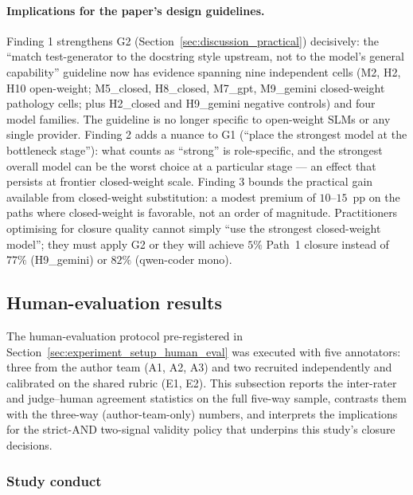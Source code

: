 \paragraph{Implications for the paper's design guidelines.}
Finding 1 strengthens G2 (Section~\ref{sec:discussion_practical}) decisively: the ``match test-generator to the docstring style upstream, not to the model's general capability'' guideline now has evidence spanning nine independent cells (M2, H2, H10 open-weight; M5\_closed, H8\_closed, M7\_gpt, M9\_gemini closed-weight pathology cells; plus H2\_closed and H9\_gemini negative controls) and four model families. The guideline is no longer specific to open-weight SLMs or any single provider. Finding 2 adds a nuance to G1 (``place the strongest model at the bottleneck stage''): what counts as ``strong'' is role-specific, and the strongest overall model can be the worst choice at a particular stage --- an effect that persists at frontier closed-weight scale. Finding 3 bounds the practical gain available from closed-weight substitution: a modest premium of $10$--$15$~pp on the paths where closed-weight is favorable, not an order of magnitude. Practitioners optimising for closure quality cannot simply ``use the strongest closed-weight model''; they must apply G2 or they will achieve $5\%$ Path~1 closure instead of $77\%$ (H9\_gemini) or $82\%$ (qwen-coder mono).

\subsection{Human-evaluation results}
\label{sec:results_human_eval}

The human-evaluation protocol pre-registered in
Section~\ref{sec:experiment_setup_human_eval} was executed with five
annotators: three from the author team (A1, A2, A3) and two recruited
independently and calibrated on the shared rubric (E1, E2). This
subsection reports the inter-rater and judge--human agreement
statistics on the full five-way sample, contrasts them with the
three-way (author-team-only) numbers, and interprets the implications
for the strict-AND two-signal validity policy that underpins this
study's closure decisions.

\subsubsection{Study conduct}
\label{sec:human_eval_conduct}

